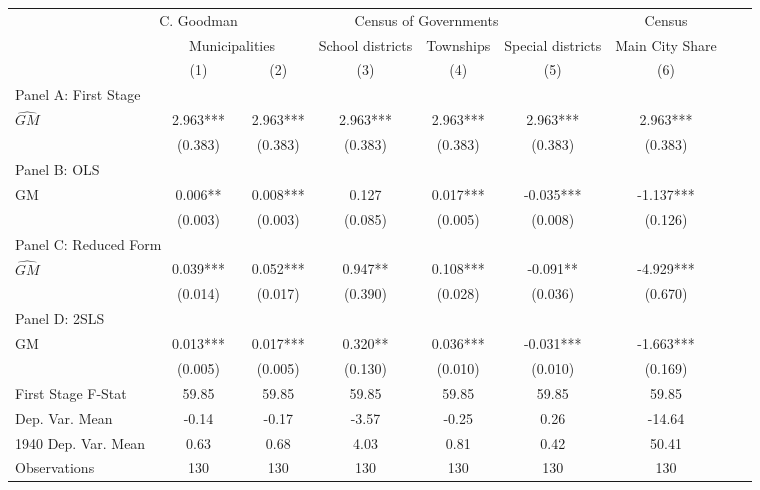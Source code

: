  \begin{tabular}{l*{8}{c}} \toprule
&\multicolumn{1}{c}{C. Goodman}&\multicolumn{4}{c}{Census of Governments}&\multicolumn{1}{c}{Census}\\\cmidrule(lr){2-2}\cmidrule(lr){3-6}\cmidrule(lr){7-7}
&\multicolumn{2}{c}{Municipalities}&\multicolumn{1}{c}{School districts}&\multicolumn{1}{c}{Townships}&\multicolumn{1}{c}{Special districts}&\multicolumn{1}{c}{Main City Share}\\\cmidrule(lr){2-3}\cmidrule(lr){4-6}\cmidrule(lr){7-7}
&\multicolumn{1}{c}{(1)}&\multicolumn{1}{c}{(2)}&\multicolumn{1}{c}{(3)}&\multicolumn{1}{c}{(4)}&\multicolumn{1}{c}{(5)}&\multicolumn{1}{c}{(6)}\\
\cmidrule(lr){1-7}
\multicolumn{6}{l}{Panel A: First Stage}\\
\cmidrule(lr){1-7}
$\widehat{GM}$  &    2.963***&    2.963***&    2.963***&    2.963***&    2.963***&    2.963***\\
                &  (0.383)   &  (0.383)   &  (0.383)   &  (0.383)   &  (0.383)   &  (0.383)   \\
\cmidrule(lr){1-7}
\multicolumn{6}{l}{Panel B: OLS}\\
\cmidrule(lr){1-7}
GM              &    0.006** &    0.008***&    0.127   &    0.017***&   -0.035***&   -1.137***\\
                &  (0.003)   &  (0.003)   &  (0.085)   &  (0.005)   &  (0.008)   &  (0.126)   \\
\cmidrule(lr){1-7}
\multicolumn{6}{l}{Panel C: Reduced Form}\\
\cmidrule(lr){1-7}
$\widehat{GM}$  &    0.039***&    0.052***&    0.947** &    0.108***&   -0.091** &   -4.929***\\
                &  (0.014)   &  (0.017)   &  (0.390)   &  (0.028)   &  (0.036)   &  (0.670)   \\
\cmidrule(lr){1-7}
\multicolumn{6}{l}{Panel D: 2SLS}\\
\cmidrule(lr){1-7}
GM              &    0.013***&    0.017***&    0.320** &    0.036***&   -0.031***&   -1.663***\\
                &  (0.005)   &  (0.005)   &  (0.130)   &  (0.010)   &  (0.010)   &  (0.169)   \\
\midrule
First Stage F-Stat&    59.85   &    59.85   &    59.85   &    59.85   &    59.85   &    59.85   \\
Dep. Var. Mean  &    -0.14   &    -0.17   &    -3.57   &    -0.25   &     0.26   &   -14.64   \\
1940 Dep. Var. Mean&     0.63   &     0.68   &     4.03   &     0.81   &     0.42   &    50.41   \\
Observations    &      130   &      130   &      130   &      130   &      130   &      130   \\
       \bottomrule \end{tabular}
